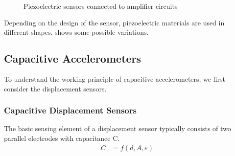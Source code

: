 \begin{figure}[!htb]
  \centering
  \hspace{4em}
  \caption[Piezoelectric sensors in amplifier circuits]{Piezoelectric sensors connected to amplifier circuits~\cite{webster2018measurement}%
    \label{fig:piezo_ampcirc}}
\end{figure}

Depending on the design of the sensor, piezoelectric materials are used in different shapes.  shows some possible variations.



\subsection{Capacitive Accelerometers}

To understand the working principle of capacitive accelerometers, we first consider the displacement sensors.

\subsubsection{Capacitive Displacement Sensors}
The basic sensing element of a displacement sensor typically consists of two parallel electrodes with capacitance C.
\begin{align}
  C &= f(d,A,\varepsilon)
\end{align}

